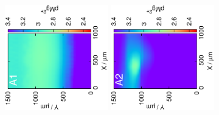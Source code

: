 \begin{figure}
\centering
\includegraphics[trim = 10mm 40mm 0mm 40mm, clip, width=0.4\textwidth, angle=-90]{img/mg_metal/liquid_uncoupled.eps} \includegraphics[trim = 10mm 40mm 0mm 40mm, clip, width=0.4\textwidth, angle=-90]{img/mg_metal/solid_uncoupled.eps}


\end{figure}
